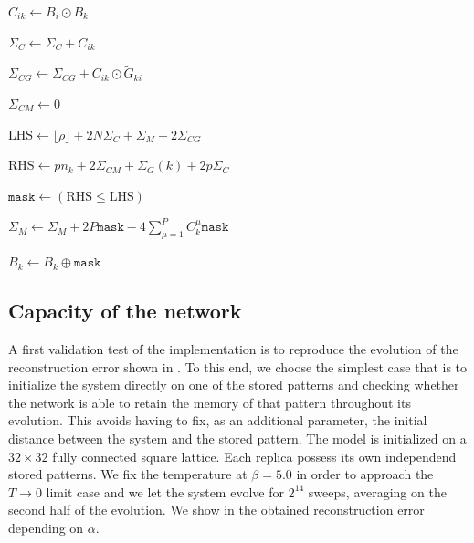 \begin{algorithm}[H]
{{{{            $C_{ik}\leftarrow B_i\odot B_k$\;

            $\Sigma_C\leftarrow\Sigma_C+C_{ik}$\;

            $\Sigma_{CG}
            \leftarrow
            \Sigma_{CG}
            +C_{ik}\odot\tilde{G}_{ki}$
        }


        $\Sigma_{CM}\leftarrow0$\;



        $\mathrm{LHS}
        \leftarrow
        \lfloor\rho\rfloor
        +2N\Sigma_C
        +\Sigma_M
        +2\Sigma_{CG}$\;


        $\mathrm{RHS}
        \leftarrow
        p n_k
        +2\Sigma_{CM}
        +\Sigma_G(k)
        +2p\Sigma_C$\;


        $\mathtt{mask}
        \leftarrow
        (\mathrm{RHS}\leq\mathrm{LHS})$


        $\Sigma_M \leftarrow \Sigma_M
        + 2P\mathtt{mask}
        - 4\sum_{\mu=1}^{P}C_k^\mu\mathtt{mask}$\;

        $B_k
        \leftarrow
        B_k\oplus\mathtt{mask}$\;
    }
}
}
\label{alg:Hopfield_bitwise_overlaps}
\end{algorithm}

\subsection{Capacity of the network}
\myindent A first validation test of the implementation is to reproduce the evolution of the reconstruction error shown in . To this end, we choose the simplest case that is to initialize the system directly on one of the stored patterns and checking whether the network is able to retain the memory of that pattern throughout its evolution. This avoids having to fix, as an additional parameter, the initial distance between the system and the stored pattern. The model is initialized on a $32 \times 32$ fully connected square lattice. Each replica possess its own independend stored patterns. We fix the temperature at $\beta=5.0$ in order to approach the $T\to 0$ limit case and we let the system evolve for $2^{14}$ sweeps, averaging on the second half of the evolution. We show in  the obtained reconstruction error depending on $\alpha$.

